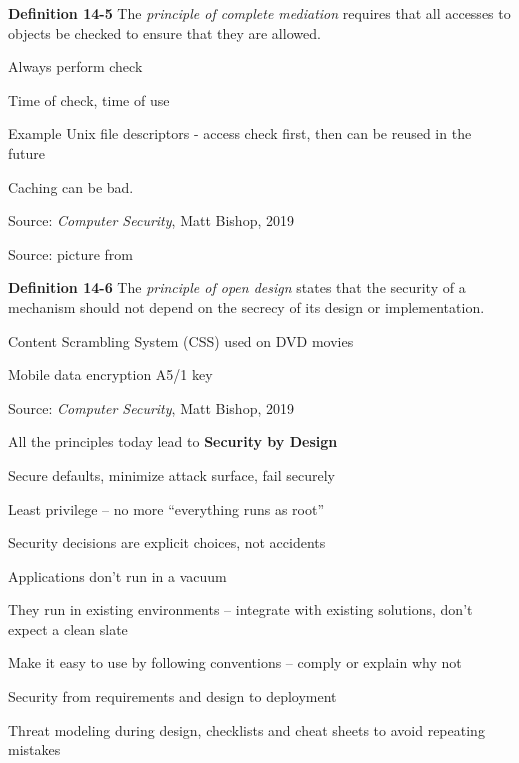 \documentclass[Screen16to9,17pt]{foils}
\begin{document}

\begin{list1}
\item {\bf Definition 14-5} The \emph{principle of complete mediation} requires that all accesses to objects be checked to ensure that they are allowed.
\item Always perform check
\item Time of check, time of use
\item Example Unix file descriptors - access check first, then can be reused in the future
\item Caching can be bad.
\end{list1}

{\footnotesize Source: \emph{Computer Security}, Matt Bishop, 2019}




Source: picture from 
\begin{list1}
\item {\bf Definition 14-6} The \emph{principle of open design} states that the security of a mechanism should not depend on the secrecy of its design or implementation.
\item Content Scrambling System (CSS) used on DVD movies
\item Mobile data encryption  A5/1 key
\end{list1}

{\footnotesize Source: \emph{Computer Security}, Matt Bishop, 2019}



\begin{list1}
\item All the principles today lead to {\bfseries Security by Design}
\begin{list2}
\item Secure defaults, minimize attack surface, fail securely
\item Least privilege -- no more ``everything runs as root''
\item Security decisions are explicit choices, not accidents
\end{list2}
\item Applications don't run in a vacuum
\begin{list2}
\item They run in existing environments -- integrate with existing solutions, don't expect a clean slate
\item Make it easy to use by following conventions -- comply or explain why not
\end{list2}
\item Security from requirements and design to deployment
\begin{list2}
\item Threat modeling during design, checklists and cheat sheets to avoid repeating mistakes
\end{list2}
\end{list1}
\end{document}
